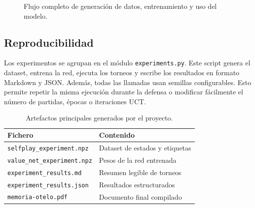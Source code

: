 \documentclass[conference,a4paper]{IEEEtran}
\begin{document}
\begin{figure}[t]
\centering
{}
\caption{Flujo completo de generación de datos, entrenamiento y uso del modelo.}
\label{fig:flujo-experimental}
\end{figure}

\subsection{Reproducibilidad}

Los experimentos se agrupan en el módulo \texttt{experiments.py}. Este script
genera el dataset, entrena la red, ejecuta los torneos y escribe los resultados
en formato Markdown y JSON. Además, todas las llamadas usan semillas
configurables. Esto permite repetir la misma ejecución durante la defensa o
modificar fácilmente el número de partidas, épocas o iteraciones UCT.

\begin{table}[h]
\centering
\caption{Artefactos principales generados por el proyecto.}
\label{tab:artefactos}
\begin{tabular}{ll}
\toprule
Fichero & Contenido \\
\midrule
\texttt{selfplay\_experiment.npz} & Dataset de estados y etiquetas \\
\texttt{value\_net\_experiment.npz} & Pesos de la red entrenada \\
\texttt{experiment\_results.md} & Resumen legible de torneos \\
\texttt{experiment\_results.json} & Resultados estructurados \\
\texttt{memoria-otelo.pdf} & Documento final compilado \\
\bottomrule
\end{tabular}
\end{table}
\end{document}
